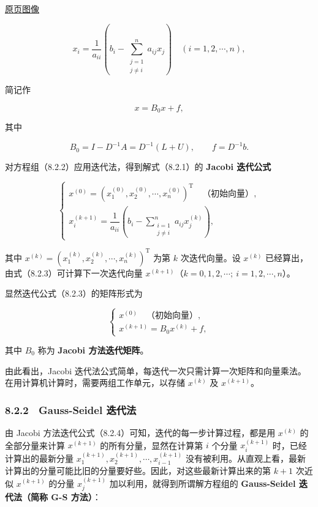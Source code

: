 \documentclass[
  10pt,
  fontset=fandol]{ctexart}
\begin{document}
\href{../../source-images/pdf-218.jpeg}{原页图像}

\[
x_i=\frac1{a_{ii}}\left(b_i-\sum_{\substack{j=1\\j\neq i}}^n a_{ij}x_j\right)\quad(i=1,2,\cdots,n),
\tag{8.2.2}
\]

简记作

\[
x=B_0x+f,
\]

其中

\[
B_0=I-D^{-1}A=D^{-1}(L+U),\qquad f=D^{-1}b.
\]

对方程组（8.2.2）应用迭代法，得到解式（8.2.1）的 \textbf{Jacobi 迭代公式}

\[
\begin{cases}
x^{(0)}=(x_1^{(0)},x_2^{(0)},\cdots,x_n^{(0)})^{\mathrm T}\quad\text{（初始向量）},\\[4pt]
x_i^{(k+1)}=\dfrac1{a_{ii}}\left(b_i-\displaystyle\sum_{\substack{i=1\\j\neq i}}^n a_{ij}x_j^{(k)}\right),
\end{cases}
\tag{8.2.3}
\]

其中 \(x^{(k)}=(x_1^{(k)},x_2^{(k)},\cdots,x_n^{(k)})^{\mathrm T}\) 为第 \(k\) 次迭代向量。设 \(x^{(k)}\) 已经算出，由式（8.2.3）可计算下一次迭代向量 \(x^{(k+1)}\)（\(k=0,\allowbreak 1,\allowbreak 2,\allowbreak \cdots;\ i=1,\allowbreak 2,\allowbreak \cdots,\allowbreak n\)）。

显然迭代公式（8.2.3）的矩阵形式为

\[
\begin{cases}
x^{(0)}\quad\text{（初始向量）},\\
x^{(k+1)}=B_0x^{(k)}+f,
\end{cases}
\tag{8.2.4}
\]

其中 \(B_0\) 称为 \textbf{Jacobi 方法迭代矩阵}。

由此看出，Jacobi 迭代法公式简单，每迭代一次只需计算一次矩阵和向量乘法。在用计算机计算时，需要两组工作单元，以存储 \(x^{(k)}\) 及 \(x^{(k+1)}\)。

\subsubsection{8.2.2　Gauss-Seidel 迭代法}\label{gauss-seidel-ux8fedux4ee3ux6cd5}

由 Jacobi 方法迭代公式（8.2.4）可知，迭代的每一步计算过程，都是用 \(x^{(k)}\) 的全部分量来计算 \(x^{(k+1)}\) 的所有分量，显然在计算第 \(i\) 个分量 \(x_i^{(k+1)}\) 时，已经计算出的最新分量 \(x_1^{(k+1)},x_2^{(k+1)},\cdots,x_{i-1}^{(k+1)}\) 没有被利用。从直观上看，最新计算出的分量可能比旧的分量要好些。因此，对这些最新计算出来的第 \(k+1\) 次近似 \(x^{(k+1)}\) 的分量 \(x_j^{(k+1)}\) 加以利用，就得到所谓解方程组的 \textbf{Gauss-Seidel 迭代法（简称 G-S 方法）}：
\end{document}
